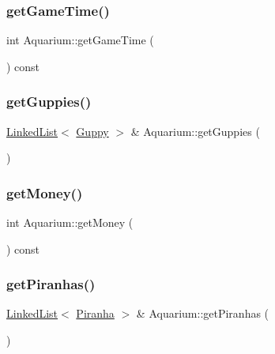 \mbox{\label{class_aquarium_aac0206880d410aec571cfc10b8ceae46}} 
\subsubsection{\texorpdfstring{get\+Game\+Time()}{getGameTime()}}
{\footnotesize\ttfamily int Aquarium\+::get\+Game\+Time (\begin{DoxyParamCaption}{ }\end{DoxyParamCaption}) const}

\mbox{\label{class_aquarium_a9214dfeb37c333eb3f95f8fc50adb933}} 
\subsubsection{\texorpdfstring{get\+Guppies()}{getGuppies()}}
{\footnotesize\ttfamily \mbox{\hyperlink{class_linked_list}{Linked\+List}}$<$ \mbox{\hyperlink{class_guppy}{Guppy}} $>$ \& Aquarium\+::get\+Guppies (\begin{DoxyParamCaption}{ }\end{DoxyParamCaption})}

\mbox{\label{class_aquarium_a313caeabfcd5936c3982a6642b5c7e2f}} 
\subsubsection{\texorpdfstring{get\+Money()}{getMoney()}}
{\footnotesize\ttfamily int Aquarium\+::get\+Money (\begin{DoxyParamCaption}{ }\end{DoxyParamCaption}) const}

\mbox{\label{class_aquarium_af6c1da11d3952590634655e81d9a4eba}} 
\subsubsection{\texorpdfstring{get\+Piranhas()}{getPiranhas()}}
{\footnotesize\ttfamily \mbox{\hyperlink{class_linked_list}{Linked\+List}}$<$ \mbox{\hyperlink{class_piranha}{Piranha}} $>$ \& Aquarium\+::get\+Piranhas (\begin{DoxyParamCaption}{ }\end{DoxyParamCaption})}

